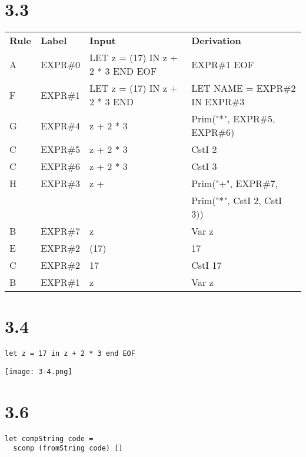 \documentclass{article}
\begin{document}
\section*{3.3}
\begin{tabular}{l l l l}
\textbf{Rule} & \textbf{Label} & \textbf{Input} & \textbf{Derivation} \\
A & EXPR\#0 & LET z = (17) IN z + 2 * 3 END EOF & EXPR\#1 EOF \\
F & EXPR\#1 & LET z = (17) IN z + 2 * 3 END & LET NAME = EXPR\#2 IN EXPR\#3 \\
G & EXPR\#4 & z + 2 * 3 & Prim("*", EXPR\#5, EXPR\#6) \\
C & EXPR\#5 & z + 2 * 3 & CstI 2 \\
C & EXPR\#6 & z + 2 * 3 & CstI 3 \\
H & EXPR\#3 & z + & Prim("+", EXPR\#7, \\
  &         &     & \quad Prim("*", CstI 2, CstI 3)) \\
B & EXPR\#7 & z & Var z \\
E & EXPR\#2 & (17) & 17 \\
C & EXPR\#2 & 17 & CstI 17 \\
B & EXPR\#1 & z & Var z 
\end{tabular}

\section*{3.4}
\begin{verbatim}
let z = 17 in z + 2 * 3 end EOF
\end{verbatim}
\texttt{[image: 3-4.png]}

\section*{3.6}

\begin{verbatim}
let compString code = 
  scomp (fromString code) []
\end{verbatim}
\end{document}
